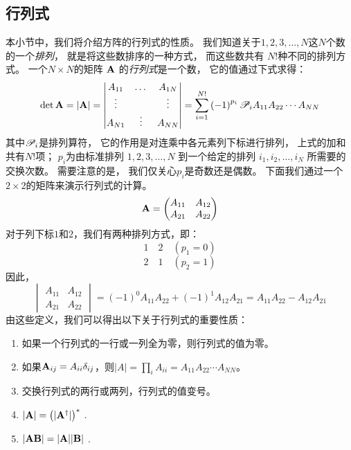 \subsection{行列式}
\label{sec:1.1.3}
本小节中，我们将介绍方阵的行列式的性质。
我们知道关于$1, 2, 3, \dots, N$这$N$个数的一个\emph{排列}，
就是将这些数排序的一种方式，
而这些数共有 $N!$种不同的排列方式。
一个$N\times N$的矩阵 $\mathbf A$ 的\emph{行列式}是一个数，
它的值通过下式求得：
\begin{equation}
 \det{\mathbf A} = \vert {\mathbf A} \vert = \begin{vmatrix}
     A_{11} &\dots &A_{1N} \\ \vdots & &\vdots \\ A_{N1} &\vdots &A_{NN} 
 \end{vmatrix} = \sum_{i=1}^{N!} \left(-1\right)^{p_i}\mathscr{P}_iA_{11}A_{22}\cdots A_{NN}
 \label{eq:1.38}
\end{equation}
其中$\mathscr{P}_i$是排列算符，
它的作用是对连乘中各元素列下标进行排列，
上式的加和共有$N!$项；
$p_i$为由标准排列 $1, 2, 3, \dots, N$ 到一个给定的排列 $i_1, i_2, \dots, i_N$ 所需要的交换次数。
需要注意的是，
我们仅关心$p_i$是奇数还是偶数。
下面我们通过一个$2 \times 2$的矩阵来演示行列式的计算。
\[{\mathbf A} = \begin{pmatrix}
 A_{11} & A_{12} \\ A_{21} & A_{22}
\end{pmatrix}\]
对于列下标$1$和$2$，我们有两种排列方式，即：
\[
1 \quad 2 \quad \left(p_1 = 0\right)\]\[
2 \quad 1 \quad \left(p_2 = 1\right)\]
因此，
\begin{equation}
 \begin{vmatrix}
     A_{11} & A_{12} \\ A_{21} &A_{22}
 \end{vmatrix} = \left(-1\right)^0 A_{11}A_{22} + \left(-1\right)^1 A_{12}A_{21} = A_{11}A_{22} - A_{12}A_{21}
 \label{eq:1.39}
\end{equation}
由这些定义，我们可以得出以下关于行列式的重要性质：
\begin{enumerate}
 \item 如果一个行列式的一行或一列全为零，则行列式的值为零。
 \item 如果${\mathbf A}_{ij} = A_{ii}\delta_{ij}$，则$\vert A\vert = \prod_i A_{ii} = A_{11}A_{22}\cdots A_{NN}$。
 \item 交换行列式的两行或两列，行列式的值变号。
 \item $\vert \mathbf{A} \vert = \left(\vert\mathbf A^\dagger\vert\right)^\ast$ .
 \item $\vert {\mathbf{AB}}\vert = \vert{\mathbf A}\vert\vert\mathbf{B}\vert$ .
\end{enumerate}

